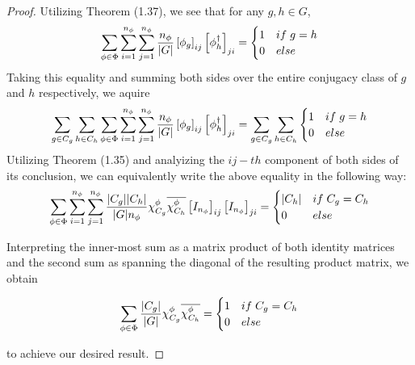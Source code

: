 \noindent \begin{proof}\cite{Tung}  Utilizing Theorem (1.37), we see that for any $g, h \in G$, $$\sum_{\phi \in \Phi} \sum_{i=1}^{n_\phi} \sum_{j=1}^{n_\phi} \frac{n_\phi}{|G|} \left[\phi_g\right]_{ij}\left[\phi_{h}^\dag\right]_{ji} = \begin{cases}
																										1 & if \hspace{1mm} g = h \\
																										0 & else
																									\end{cases}$$
Taking this equality and summing both sides over the entire conjugacy class of $g$ and $h$ respectively, we aquire
\begin{equation}
	\begin{aligned}
		\sum_{g \in C_g} \sum_{h\in C_h} \sum_{\phi \in \Phi} \sum_{i=1}^{n_\phi} \sum_{j=1}^{n_\phi} \frac{n_\phi}{|G|} \left[\phi_g\right]_{ij}\left[\phi_{h}^\dag\right]_{ji} = \sum_{g \in C_g} \sum_{h\in C_h} \begin{cases}
																										1 & if \hspace{1mm} g = h \\
																										0 & else
																									\end{cases}
	\end{aligned}
\end{equation}
Utilizing Theorem (1.35) and analyizing the $ij-th$ component of both sides of its conclusion, we can equivalently write the above equality in the following way:
\begin{equation}
	\begin{aligned}
		 \sum_{\phi \in \Phi} \sum_{i=1}^{n_\phi} \sum_{j=1}^{n_\phi} \frac{|C_g||C_h|}{|G|n_\phi}\chi^\phi_{C_g}\overline{\chi^\phi_{C_h}} \left[I_{n_\phi}\right]_{ij}\left[I_{n_\phi}\right]_{ji} = \begin{cases}
																										|C_h| & if \hspace{1mm} C_g = C_h \\
																										0 & else
																									\end{cases}
	\end{aligned}
\end{equation}

Interpreting the inner-most sum as a matrix product of both identity matrices and the second sum as spanning the diagonal of the resulting product matrix, we obtain

\begin{equation}
	\begin{aligned}
		 \sum_{\phi \in \Phi} \frac{|C_g|}{|G|}\chi^\phi_{C_g}\overline{\chi^\phi_{C_h}} = \begin{cases}
																										1 & if \hspace{1mm} C_g = C_h \\
																										0 & else
																									\end{cases}
	\end{aligned}
\end{equation}

to achieve our desired result.  \end{proof}


